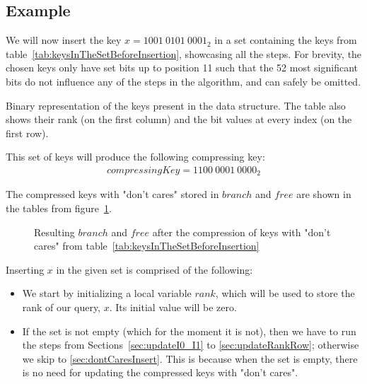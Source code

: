 \subsection{Example} \label{sec:dontCaresInsertExample}

We will now insert the key $x = 1001\ 0101\ 0001_2$ in a set containing the keys from table~\ref{tab:keysInTheSetBeforeInsertion}, showcasing all the steps. For brevity, the chosen keys only have set bits up to position 11 such that the 52 most significant bits do not influence any of the steps in the algorithm, and can safely be omitted.

\begin{table}[H]
\centering

\caption[Example set of keys in binary]{Binary representation of the keys present in the data structure. The table also shows their rank (on the first column) and the bit values at every index (on the first row).}
\label{tab:keysInTheSetBeforeInsertion}
\end{table}

This set of keys will produce the following compressing key:
\begin{align*}
    compressingKey = 1100\ 0001\ 0000_2
\end{align*}

The compressed keys with "don't cares" stored in $branch$ and $free$ are shown in the tables from figure~\ref{fig:branchAndFreeBeforeInsertion}.

\begin{figure}[H]
\centering

\caption{Resulting $branch$ and $free$ after the compression of keys with "don't cares" from table~\ref{tab:keysInTheSetBeforeInsertion}}
\label{fig:branchAndFreeBeforeInsertion}
\end{figure}

Inserting $x$ in the given set is comprised of the following:

\begin{itemize}
    \item
    We start by initializing a local variable $rank$, which will be used to store the rank of our query, $x$. Its initial value will be zero.
    
    \item
    If the set is not empty (which for the moment it is not), then we have to run the steps from Sections~\ref{sec:updateI0_I1} to \ref{sec:updateRankRow}; otherwise we skip to \ref{sec:dontCaresInsert}. This is because when the set is empty, there is no need for updating the compressed keys with "don't cares".
\end{itemize}

